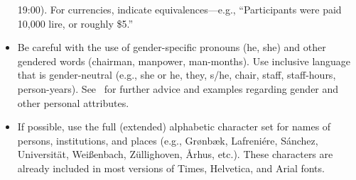 \begin{itemize}
                                  19:00).  For currencies, indicate equivalences---e.g., ``Participants
                                  were paid 10,000 lire, or roughly \$5.''
                                \item Be careful with the use of gender-specific pronouns (he, she)
                                  and other gendered words (chairman, manpower, man-months). Use
                                  inclusive language that is gender-neutral (e.g., she or he, they,
                                  s/he, chair, staff, staff-hours,
                                  person-years). See~\cite{Schwartz:1995:GBF} for further advice and
                                  examples regarding gender and other personal attributes.
                                \item If possible, use the full (extended) alphabetic character set
                                  for names of persons, institutions, and places (e.g.,
                                  Gr{\o}nb{\ae}k, Lafreni\'ere, S\'anchez, Universit{\"a}t,
                                  Wei{\ss}enbach, Z{\"u}llighoven, \r{A}rhus, etc.).  These characters
                                  are already included in most versions of Times, Helvetica, and Arial
                                  fonts.
                                \end{itemize}